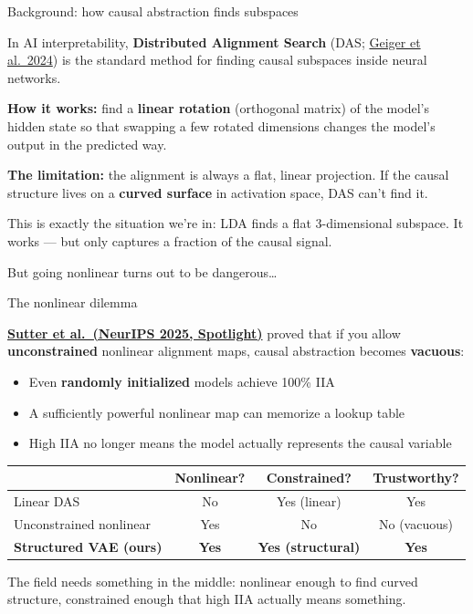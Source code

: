 \documentclass[aspectratio=169,11pt]{beamer}
\begin{document}
\begin{frame}{Background: how causal abstraction finds subspaces}

In AI interpretability, \textbf{Distributed Alignment Search} (DAS; \href{https://arxiv.org/abs/2303.02536}{Geiger et al.\ 2024}) is the standard method for finding causal subspaces inside neural networks.

\vspace{0.5em}
\textbf{How it works:} find a \textbf{linear rotation} (orthogonal matrix) of the model's hidden state so that swapping a few rotated dimensions changes the model's output in the predicted way.

\vspace{0.5em}
\textbf{The limitation:} the alignment is always a flat, linear projection. If the causal structure lives on a \textbf{curved surface} in activation space, DAS can't find it.

\vspace{0.5em}
This is exactly the situation we're in: LDA finds a flat 3-dimensional subspace. It works --- but only captures a fraction of the causal signal.

\vspace{0.5em}
But going nonlinear turns out to be dangerous\ldots
\end{frame}

\begin{frame}{The nonlinear dilemma}

\textbf{\href{https://arxiv.org/abs/2501.02043}{Sutter et al.\ (NeurIPS 2025, Spotlight)}} proved that if you allow \textbf{unconstrained} nonlinear alignment maps, causal abstraction becomes \textbf{vacuous}:

\vspace{0.3em}
\begin{itemize}\setlength\itemsep{2pt}
  \item Even \textbf{randomly initialized} models achieve 100\% IIA
  \item A sufficiently powerful nonlinear map can memorize a lookup table
  \item High IIA no longer means the model actually represents the causal variable
\end{itemize}

\vspace{0.5em}
{\small
\begin{tabular}{lccc}
\toprule
& \textbf{Nonlinear?} & \textbf{Constrained?} & \textbf{Trustworthy?} \\
\midrule
Linear DAS & No & Yes (linear) & Yes \\
Unconstrained nonlinear & Yes & No & No (vacuous) \\
\textbf{Structured VAE (ours)} & \textbf{Yes} & \textbf{Yes (structural)} & \textbf{Yes} \\
\bottomrule
\end{tabular}
}

\vspace{0.5em}
The field needs something in the middle: nonlinear enough to find curved structure, constrained enough that high IIA actually means something.
\end{frame}
\end{document}
